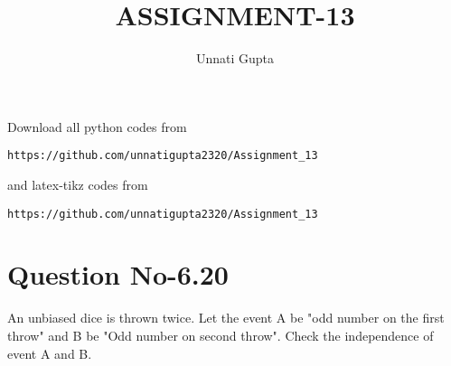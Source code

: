 \documentclass[journal,12pt,twocolumn]{IEEEtran}
\begin{document}
     \def\centbox#1{\makebox[0in]{#1}}
     \def\topbox#1{\raisebox{-\baselineskip}[0in][0in]{#1}}
     \def\midbox#1{\raisebox{-0.5\baselineskip}[0in][0in]{#1}}
\vspace{3cm}
\title{ASSIGNMENT-13}
\author{Unnati Gupta}
\maketitle
\newpage
\bigskip
\renewcommand{\thefigure}{\theenumi}
\renewcommand{\thetable}{\theenumi}
Download all python codes from 
\begin{lstlisting}
https://github.com/unnatigupta2320/Assignment_13
\end{lstlisting}
%
and latex-tikz codes from 
%
\begin{lstlisting}
https://github.com/unnatigupta2320/Assignment_13
\end{lstlisting}
%
\section{Question No-6.20}
An unbiased dice is thrown twice. Let the event A be "odd number on the first throw" and B be "Odd number on second throw". Check the independence of event A and B. 
\end{document}
